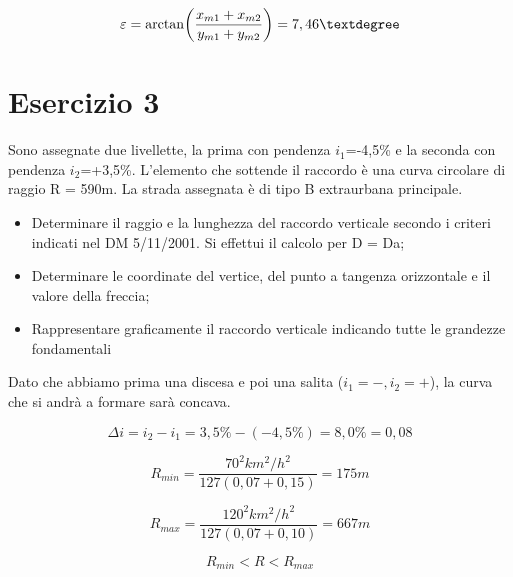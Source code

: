 \documentclass[
a4paper,
12pt, 
twoside]{scrbook}
\begin{document}
{{{{{{{{{{{    \begin{equation}
    	\varepsilon=\arctan(\frac{x_{m1}+x_{m2}}{y_{m1}+y_{m2}})=7,46\textdegree
    \end{equation}
    
    \section{Esercizio 3}
    
    \begin{boxK}
    	Sono assegnate due livellette, la prima con pendenza $i_1$=-4,5\% e la seconda con pendenza $i_2$=+3,5\%. L’elemento che sottende il raccordo è una curva circolare di raggio R = 590m. La strada assegnata è di tipo B extraurbana principale.  
    	\begin{itemize}
    		\item Determinare il raggio e la lunghezza del raccordo verticale secondo i criteri indicati nel                  DM 5/11/2001. Si effettui il calcolo per D = Da;
    		\item Determinare le coordinate del vertice, del punto a tangenza orizzontale e il valore della freccia;  
    		\item Rappresentare graficamente il raccordo verticale indicando tutte le grandezze fondamentali
    	\end{itemize}
    \end{boxK}
    
    \begin{boxF}
    	Dato che abbiamo prima una discesa e poi una salita ($i_1=-, i_2=+$), la curva che si andrà a formare sarà concava.
    \end{boxF}
    
    \begin{equation}
    	\Delta i= i_2-i_1= 3,5\%-(-4,5\%)= 8,0\%= 0,08
    \end{equation}
    
     \begin{equation}
    	R_{min}=\frac{70^2km^2/h^2}{127(0,07+0,15)}=175m
    \end{equation}
    
    \begin{equation}
    	R_{max}=\frac{120^2km^2/h^2}{127(0,07+0,10)}=667m
    \end{equation} 	
    
    \begin{equation}
    	R_{min}<R<R_{max}
    \end{equation} 	
    
}}}}}}}}}}}
\end{document}
